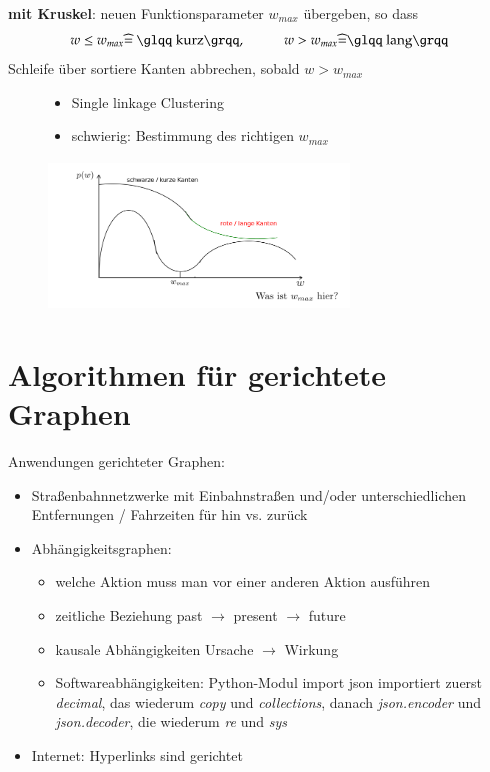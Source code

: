     \textbf{mit Kruskel}: neuen Funktionsparameter $w_{max}$ übergeben, so dass
    \[w \leq w_{max} \widehat{=}\text{ \glqq kurz\grqq},\hspace*{1cm} w > w_{max} \widehat{=} \text{\glqq lang\grqq} \]
    Schleife über sortiere Kanten abbrechen, sobald $w > w_{max}$
    \begin{figure}[htbp]
        \begin{minipage}{8cm}
            \vspace*{0mm}
            \begin{itemize}
                \item \glqq Single linkage Clustering\grqq
                \item schwierig: Bestimmung des richtigen $w_{max}$
            \end{itemize}
        \end{minipage}
        \begin{minipage}{8cm}
            \vspace*{0mm}
            \includegraphics[width=8cm,height=4cm,keepaspectratio]{./Pictures/wGraph.png}
        \end{minipage}
    \end{figure}


    \section{Algorithmen für gerichtete Graphen}

    Anwendungen gerichteter Graphen:
    \begin{itemize}
        \item Straßenbahnnetzwerke mit Einbahnstraßen und/oder unterschiedlichen Entfernungen / Fahrzeiten für hin vs. zurück
        \item Abhängigkeitsgraphen:
        \begin{itemize}
            \item welche Aktion muss man vor einer anderen Aktion ausführen
            \item zeitliche Beziehung \hspace*{1cm}past $\rightarrow$ present $\rightarrow$ future
            \item kausale Abhängigkeiten \hspace*{0.1cm} Ursache $\rightarrow$ Wirkung
            \item Softwareabhängigkeiten: Python-Modul import json importiert zuerst \emph{decimal}, das wiederum \emph{copy} und \emph{collections}, danach \emph{json.encoder} und \emph{json.decoder}, die wiederum \emph{re} und \emph{sys}
        \end{itemize}
        \item Internet: Hyperlinks sind gerichtet
    \end{itemize}

